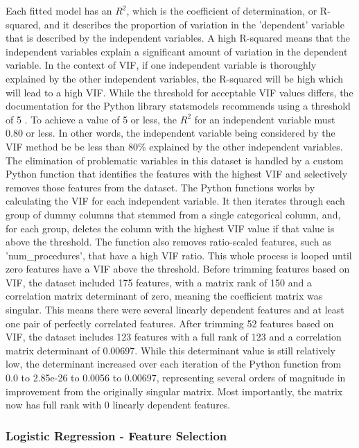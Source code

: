 \documentclass[sigconf]{acmart}
\begin{document}
Each fitted model has an \(R^2\), which is the coefficient of determination, or R-squared, and it describes the proportion of variation in the 'dependent' variable that is described by the independent variables. A high R-squared means that the independent variables explain a significant amount of variation in the dependent variable. In the context of VIF, if one independent variable is thoroughly explained by the other independent variables, the R-squared will be high which will lead to a high VIF. While the threshold for acceptable VIF values differs, the documentation for the Python library statsmodels recommends using a threshold of 5 \cite{cite15}. To achieve a value of 5 or less, the \(R^2\) for an independent variable must 0.80 or less. In other words, the independent variable being considered by the VIF method be be less than 80\% explained by the other independent variables.
The elimination of problematic variables in this dataset is handled by a custom Python function that identifies the features with the highest VIF and selectively removes those features from the dataset. The Python functions works by calculating the VIF for each independent variable. It then iterates through each group of dummy columns that stemmed from a single categorical column, and, for each group, deletes the column with the highest VIF value if that value is above the threshold. The function also removes ratio-scaled features, such as 'num\_procedures', that have a high VIF ratio. This whole process is looped until zero features have a VIF above the threshold.
Before trimming features based on VIF, the dataset included 175 features, with a matrix rank of 150 and a correlation matrix determinant of zero, meaning the coefficient matrix was singular. This means there were several linearly dependent features and at least one pair of perfectly correlated features. After trimming 52 features based on VIF, the dataset includes 123 features with a full rank of 123 and a correlation matrix determinant of 0.00697. While this determinant value is still relatively low, the determinant increased over each iteration of the Python function from 0.0 to 2.85e-26 to 0.0056 to 0.00697, representing several orders of magnitude in improvement from the originally singular matrix. Most importantly, the matrix now has full rank with 0 linearly dependent features.

\subsubsection{Logistic Regression - Feature Selection}
\end{document}
